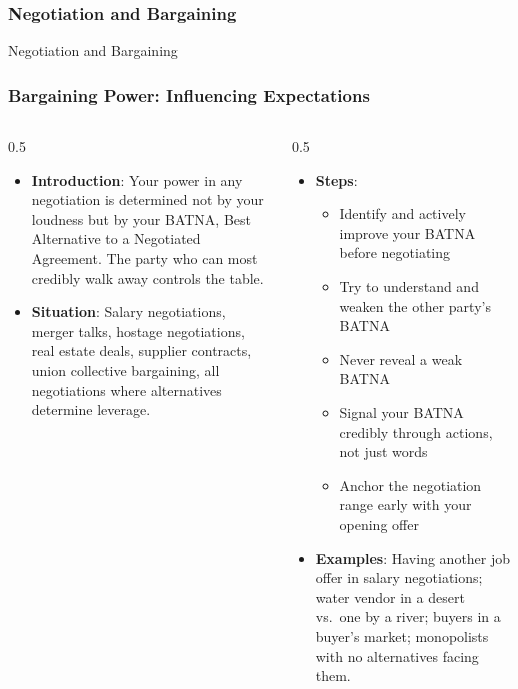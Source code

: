 \begin{frame}[fragile]\frametitle{Negotiation and Bargaining}
\begin{center}
{\Large Negotiation and Bargaining}
\end{center}
\end{frame}



\begin{frame}[fragile]\frametitle{Bargaining Power: Influencing Expectations}
\begin{columns}
    \begin{column}[T]{0.5\linewidth}
      \begin{itemize}
        \item \textbf{Introduction}: Your power in any negotiation is determined not by your loudness but by your BATNA, Best Alternative to a Negotiated Agreement. The party who can most credibly walk away controls the table.
        \item \textbf{Situation}: Salary negotiations, merger talks, hostage negotiations, real estate deals, supplier contracts, union collective bargaining, all negotiations where alternatives determine leverage.
      \end{itemize}
    \end{column}
    \begin{column}[T]{0.5\linewidth}
      \begin{itemize}
        \item \textbf{Steps}:
        \begin{itemize}
          \item Identify and actively improve your BATNA before negotiating
          \item Try to understand and weaken the other party's BATNA
          \item Never reveal a weak BATNA
          \item Signal your BATNA credibly through actions, not just words
          \item Anchor the negotiation range early with your opening offer
        \end{itemize}\item \textbf{Examples}: Having another job offer in salary negotiations; water vendor in a desert vs.\ one by a river; buyers in a buyer's market; monopolists with no alternatives facing them.
      \end{itemize}
    \end{column}
  \end{columns}
\end{frame}

